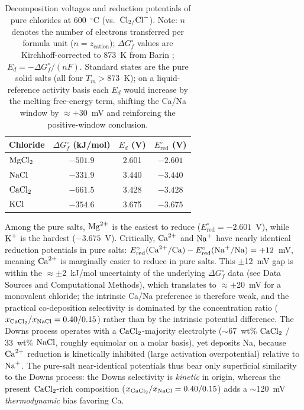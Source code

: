 \documentclass[11pt]{article}
\begin{document}
\begin{table}[!ht]
\centering
\footnotesize
\caption{Decomposition voltages and reduction potentials of pure chlorides at 600~$^{\circ}$C (vs.\ $\ce{Cl2/Cl-}$). Note: $n$ denotes the number of electrons transferred per formula unit ($n = z_{\mathrm{cation}}$); $\Delta G^{\circ}_f$ values are Kirchhoff-corrected to 873~K from Barin \cite{barin1995}; $E_d = -\Delta G^{\circ}_f/(nF)$. Standard states are the pure solid salts (all four $T_m > 873$~K); on a liquid-reference activity basis each $E_d$ would increase by the melting free-energy term, shifting the Ca/Na window by $\approx$+30~mV and reinforcing the positive-window conclusion.}
\label{tab:Ed}
\begin{tabular}{lccc}
\toprule
Chloride & $\Delta G^{\circ}_f$ (kJ/mol) & $E_d$ (V) & $E^{\circ}_{\mathrm{red}}$ (V) \\
\midrule
$\ce{MgCl2}$ & $-501.9$ & 2.601 & $-2.601$ \\
$\ce{NaCl}$  & $-331.9$ & 3.440 & $-3.440$ \\
$\ce{CaCl2}$ & $-661.5$ & 3.428 & $-3.428$ \\
$\ce{KCl}$   & $-354.6$ & 3.675 & $-3.675$ \\
\bottomrule
\end{tabular}
\end{table}

Among the pure salts, $\ce{Mg^{2+}}$ is the easiest to reduce ($E^{\circ}_{\mathrm{red}} = -2.601$~V), while $\ce{K+}$ is the hardest ($-3.675$~V). Critically, $\ce{Ca^{2+}}$ and $\ce{Na+}$ have nearly identical reduction potentials in pure salts: $E^{\circ}_{\mathrm{red}}(\ce{Ca^{2+}/Ca}) - E^{\circ}_{\mathrm{red}}(\ce{Na+/Na}) = +12$~mV, meaning $\ce{Ca^{2+}}$ is marginally easier to reduce in pure salts. This $\pm$12~mV gap is within the $\approx\pm$2~kJ/mol uncertainty of the underlying $\Delta G^{\circ}_f$ data (see Data Sources and Computational Methods), which translates to $\approx\pm$20~mV for a monovalent chloride; the intrinsic Ca/Na preference is therefore weak, and the practical co-deposition selectivity is dominated by the concentration ratio ($x_{\ce{CaCl2}}/x_{\ce{NaCl}} = 0.40/0.15$) rather than by the intrinsic potential difference. The Downs process operates with a $\ce{CaCl2}$-majority electrolyte ($\sim$67~wt\% $\ce{CaCl2}$ / 33~wt\% $\ce{NaCl}$, roughly equimolar on a molar basis), yet deposits Na, because $\ce{Ca^{2+}}$ reduction is kinetically inhibited (large activation overpotential) relative to $\ce{Na+}$. The pure-salt near-identical potentials thus bear only superficial similarity to the Downs process: the Downs selectivity is \emph{kinetic} in origin, whereas the present $\ce{CaCl2}$-rich composition ($x_{\ce{CaCl2}}/x_{\ce{NaCl}} = 0.40/0.15$) adds a $\sim$120~mV \emph{thermodynamic} bias favoring Ca.
\end{document}
